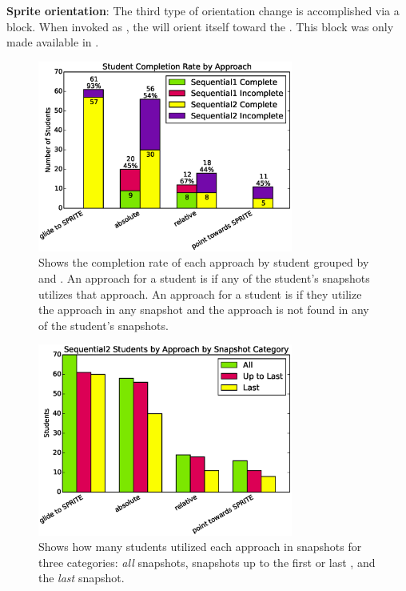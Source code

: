 \textbf{Sprite orientation}: The third type of orientation change is
accomplished via a \pointtoward{} block. When invoked as
\pointtoward[\zebra{}]{}, the \net{} will orient itself toward the
\zebra{}. This block was only made available in \stwo{}.

\begin{figure}[!t]
\centering
\includegraphics[width=3.3in]{graphs/approach_student_success.eps}
\caption{Shows the completion rate of each approach by student grouped by
  \sone{} and \stwo{}. An approach for a student is \com{} if any of the
  student's \com{} snapshots utilizes that approach. An approach for a student
  is \incom{} if they utilize the approach in any \incom{} snapshot and the
  approach is not found in any of the student's \com{} snapshots.}
\end{figure}

\begin{figure}[!t]
\centering \includegraphics[width=3.3in]{graphs/approach_bar_Sequential2.eps}
\caption{Shows how many students utilized each approach in \stwo{} snapshots
  for three categories: \emph{all} snapshots, snapshots up to the first \com{}
  or last \incom{}, and the \emph{last} snapshot.}
\end{figure}

